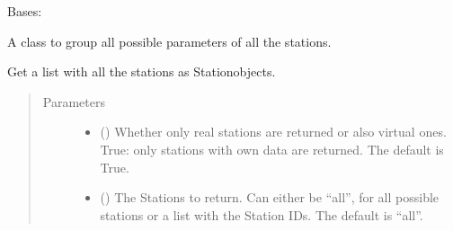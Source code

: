 \documentclass[letterpaper,10pt,english]{sphinxmanual}
\begin{document}
\begin{fulllineitems}
\label{\detokenize{weatherDB:weatherDB.stations.GroupStations}}
\sphinxAtStartPar
Bases: 

\sphinxAtStartPar
A class to group all possible parameters of all the stations.

\begin{fulllineitems}
\label{\detokenize{weatherDB:weatherDB.stations.GroupStations.__init__}}
\end{fulllineitems}


\begin{fulllineitems}
\label{\detokenize{weatherDB:weatherDB.stations.GroupStations.create_roger_ts}}
\sphinxAtStartPar
Get a list with all the stations as Station\sphinxhyphen{}objects.
\begin{quote}\begin{description}
\item[{Parameters}] \leavevmode\begin{itemize}
\item {} 
\sphinxAtStartPar
{} (\sphinxstyleliteralemphasis{\sphinxupquote{, }}) \textendash{} Whether only real stations are returned or also virtual ones.
True: only stations with own data are returned.
The default is True.

\item {} 
\sphinxAtStartPar
{} (\sphinxstyleliteralemphasis{\sphinxupquote{, }}) \textendash{} The Stations to return.
Can either be “all”, for all possible stations
or a list with the Station IDs.
The default is “all”.


\end{itemize}
\end{description}
\end{quote}
\end{fulllineitems}
\end{fulllineitems}
\end{document}
